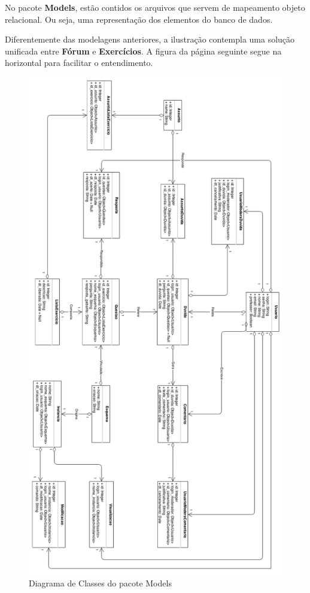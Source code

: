 \documentclass[graduacao,brazil]{ThesisPUC}
\begin{document}
No pacote \textbf{Models}, est\~{a}o contidos os arquivos que servem de mapeamento objeto
relacional. Ou seja, uma representa\c{c}\~{a}o dos elementos do banco de dados.

Diferentemente das modelagens anteriores, a ilustra\c{c}\~{a}o contempla uma solu\c{c}\~{a}o
unificada entre \textbf{F\'{o}rum} e \textbf{Exerc\'{i}cios}. A figura da p\'{a}gina
seguinte segue na horizontal para facilitar o entendimento.

\begin{figure}[H]
    \centering
    \includegraphics[width=\linewidth]{Imagens/DiagramaDeClasseModels.png}
    \caption{Diagrama de Classes do pacote Models}
\end{figure}
\end{document}
